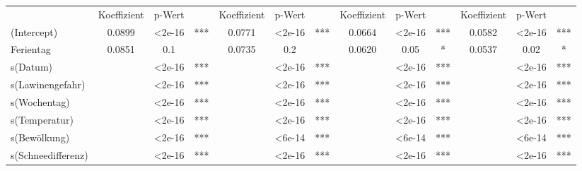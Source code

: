 \documentclass[12pt]{scrreprt}
\begin{document}
\begin{table}[htbp]
\begin{adjustbox}{max width=\textwidth}
\begin{tabular}{l|ccc|ccc|ccc|ccc|}
		& Koeffizient & p-Wert &       & Koeffizient & p-Wert &       & Koeffizient & p-Wert &       & Koeffizient & p-Wert & \multicolumn{1}{c}{} \\
		\cmidrule{2-13}    (Intercept) & 0.0899 & <2e-16 & ***   & 0.0771 & <2e-16 & ***   & 0.0664 & <2e-16 & ***   & 0.0582 & <2e-16 & *** \\
		Ferientag & 0.0851 & 0.1   &       & 0.0735 & 0.2   &       & 0.0620 & 0.05  & *     & 0.0537 & 0.02  & * \\
		s(Datum) &       & <2e-16 & ***   &       & <2e-16 & ***   &       & <2e-16 & ***   &       & <2e-16 & *** \\
		s(Lawinengefahr) &       & <2e-16 & ***   &       & <2e-16 & ***   &       & <2e-16 & ***   &       & <2e-16 & *** \\
		s(Wochentag) &       & <2e-16 & ***   &       & <2e-16 & ***   &       & <2e-16 & ***   &       & <2e-16 & *** \\
		s(Temperatur) &       & <2e-16 & ***   &       & <2e-16 & ***   &       & <2e-16 & ***   &       & <2e-16 & *** \\
		s(Bewölkung) &       & <2e-16 & ***   &       & <6e-14 & ***   &       & <6e-14 & ***   &       & <6e-14 & *** \\
		s(Schneedifferenz) &       & <2e-16 & ***   &       & <2e-16 & ***   &       & <2e-16 & ***   &       & <2e-16 & *** \\
		\cmidrule{2-13}    \end{tabular}%
	\end{adjustbox}
	\label{tab:Szenario 1 im Zeitmodell}%
\end{table}%
\end{document}
